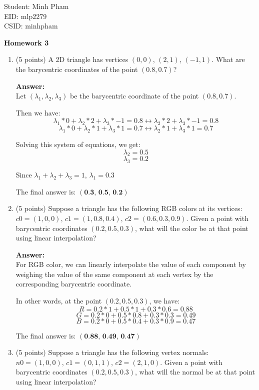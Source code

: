 \documentclass[12pt]{letter}
\begin{document}
Student: Minh Pham \\
EID: mlp2279 \\
CSID: minhpham

\begin{center}
	\textbf{Homework 3} \\
\end{center}

\begin{enumerate}
	\item (5 points)
	A 2D triangle has vertices $(0, 0)$, $(2, 1)$, $(−1, 1)$.
	What are the barycentric coordinates of the point $(0.8, 0.7)$?
	
	\textbf{Answer:} \\
	Let $(\lambda_1, \lambda_2, \lambda_3)$ be the barycentric coordinate of the point $(0.8, 0.7)$.

	Then we have:
	$$\lambda_1 * 0 + \lambda_2 * 2 + \lambda_3 * -1 = 0.8 \leftrightarrow \lambda_2 * 2 + \lambda_3 * -1 = 0.8 $$
	$$\lambda_1 * 0 + \lambda_2 * 1 + \lambda_3 * 1 = 0.7  \leftrightarrow \lambda_2 * 1 + \lambda_3 * 1 = 0.7  $$
	
	Solving this system of equations, we get:
	$$	\lambda_2 = 0.5$$
	$$\lambda_3 = 0.2$$
	
	Since $\lambda_1 + \lambda_2 + \lambda_3 = 1$, $\lambda_1 = 0.3$
	
	The final answer is: $(\textbf{0.3, 0.5, 0.2})$
	
	\item (5 points)
	Suppose a triangle has the following RGB colors at its vertices: $c0 = (1, 0, 0)$, $c1 = (1, 0.8, 0.4)$, $c2 = (0.6, 0.3, 0.9)$.
	Given a point with barycentric coordinates $(0.2, 0.5, 0.3)$, what will the color be at that point using linear interpolation?
	
	\textbf{Answer:} \\
	For RGB color, we can linearly interpolate the value of each component by weighing the value of the same component at each vertex by the corresponding barycentric coordinate.
	
	In other words, at the point $(0.2, 0.5, 0.3)$, we have:
	$$ R = 0.2 * 1 + 0.5 * 1 + 0.3 * 0.6 = 0.88   $$
	$$ G = 0.2 * 0 + 0.5 * 0.8 + 0.3 * 0.3 = 0.49 $$
	$$ B = 0.2 * 0 + 0.5 * 0.4 + 0.3 * 0.9 = 0.47 $$
	
	The final answer is: $(\textbf{0.88, 0.49, 0.47})$	
	
	\item (5 points)
	Suppose a triangle has the following vertex normals: $n0 = (1, 0, 0)$, $c1 = (0, 1, 1)$, $c2 = (2, 1, 0)$.
	Given a point with barycentric coordinates $(0.2, 0.5, 0.3)$, what will the normal be at that point using linear interpolation?
	

\end{enumerate}
\end{document}
